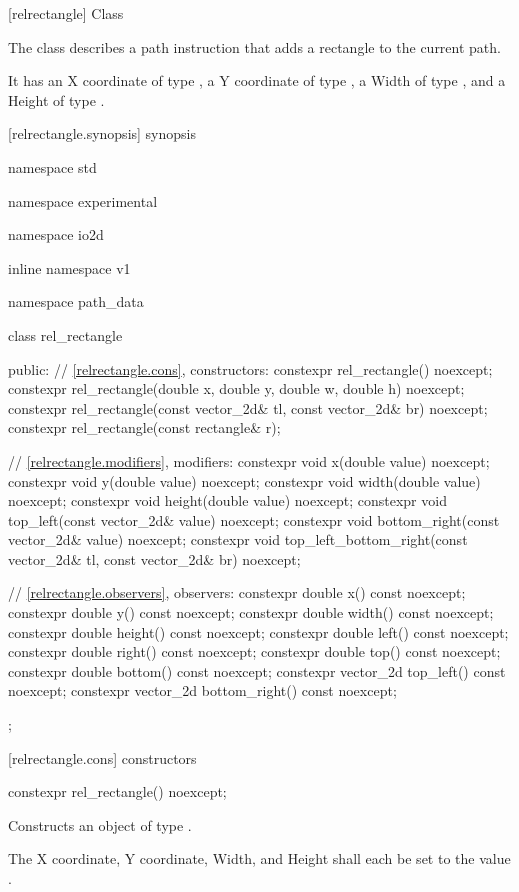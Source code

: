  [relrectangle] {Class }

\pnum
{}
The class  describes a path instruction that adds a rectangle to the current path.

\pnum
It has an X coordinate of type , a Y coordinate of type , a Width of type , and a Height of type .

 [relrectangle.synopsis] { synopsis}

\begin{codeblock}
namespace std { namespace experimental { namespace io2d { inline namespace v1 {
  namespace path_data {
    class rel_rectangle {
    public:
      // \ref{relrectangle.cons}, constructors:
      constexpr rel_rectangle() noexcept;
      constexpr rel_rectangle(double x, double y, double w, double h) noexcept;
      constexpr rel_rectangle(const vector_2d& tl, const vector_2d& br) 
        noexcept;
      constexpr rel_rectangle(const rectangle& r);

      // \ref{relrectangle.modifiers}, modifiers:
      constexpr void x(double value) noexcept;
      constexpr void y(double value) noexcept;
      constexpr void width(double value) noexcept;
      constexpr void height(double value) noexcept;
      constexpr void top_left(const vector_2d& value) noexcept;
      constexpr void bottom_right(const vector_2d& value) noexcept;
      constexpr void top_left_bottom_right(const vector_2d& tl,
        const vector_2d& br) noexcept;

      // \ref{relrectangle.observers}, observers:
      constexpr double x() const noexcept;
      constexpr double y() const noexcept;
      constexpr double width() const noexcept;
      constexpr double height() const noexcept;
      constexpr double left() const noexcept;
      constexpr double right() const noexcept;
      constexpr double top() const noexcept;
      constexpr double bottom() const noexcept;
      constexpr vector_2d top_left() const noexcept;
      constexpr vector_2d bottom_right() const noexcept;
    };
  }
} } } }
\end{codeblock}

 [relrectangle.cons] { constructors}

\begin{itemdecl}
constexpr rel_rectangle() noexcept;
\end{itemdecl}
\begin{itemdescr}
\pnum
\effects
Constructs an object of type .

\pnum
The X coordinate, Y coordinate, Width, and Height shall each be set to the value .
\end{itemdescr}

